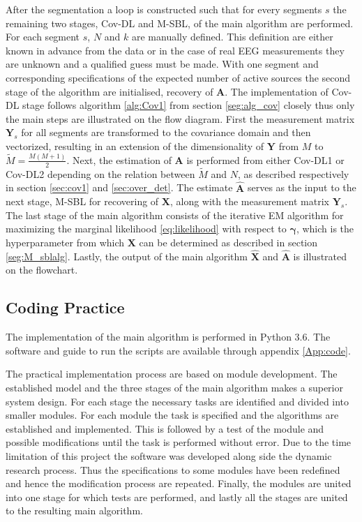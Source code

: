 After the segmentation a loop is constructed such that for every segments $s$ the remaining two stages, Cov-DL and M-SBL, of the main algorithm are performed. 
For each segment $s$, $N$ and $k$ are manually defined. 
This definition are either known in advance from the data or in the case of real EEG measurements they are unknown and a qualified guess must be made.
With one segment and corresponding specifications of the expected number of active sources the second stage of the algorithm are initialised, recovery of $\mathbf{A}$.
The implementation of Cov-DL stage follows algorithm \ref{alg:Cov1} from section \ref{seg:alg_cov} closely thus only the main steps are illustrated on the flow diagram.
First the measurement matrix $\mathbf{Y}_s$ for all segments are transformed to the covariance domain and then vectorized, resulting in an extension of the dimensionality of $\mathbf{Y}$ from $M$ to $\widetilde{M} = \frac{M(M+1)}{2}$.
Next, the estimation of $\mathbf{A}$ is performed from either Cov-DL1 or Cov-DL2 depending on the relation between $\widetilde{M}$ and $N$, as described respectively in section \ref{sec:cov1} and \ref{sec:over_det}.
The estimate $\hat{\mathbf{A}}$ serves as the input to the next stage, M-SBL for recovering of $\mathbf{X}$, along with the measurement matrix $\mathbf{Y}_s$. 
The last stage of the main algorithm consists of the iterative EM algorithm for maximizing the marginal likelihood \eqref{eq:likelihood} with respect to $\boldsymbol{\gamma}$, which is the hyperparameter from which $\mathbf{X}$ can be determined as described in section \ref{seg:M_sblalg}. 
Lastly, the output of the main algorithm $\hat{\mathbf{X}}$ and $\hat{\mathbf{A}}$ is illustrated on the flowchart.

\subsection{Coding Practice}
The implementation of the main algorithm is performed in Python 3.6. The software and guide to run the scripts are available through appendix \ref{App:code}.

The practical implementation process are based on module development. 
The established model and the three stages of the main algorithm makes a superior system design. 
For each stage the necessary tasks are identified and divided into smaller modules. 
For each module the task is specified and the algorithms are established and implemented. 
This is followed by a test of the module and possible modifications until the task is performed without error. 
Due to the time limitation of this project the software was developed along side the dynamic research process. 
Thus the specifications to some modules have been redefined and hence the modification process are repeated. 
Finally, the modules are united into one stage for which tests are performed, and lastly all the stages are united to the resulting main algorithm.


